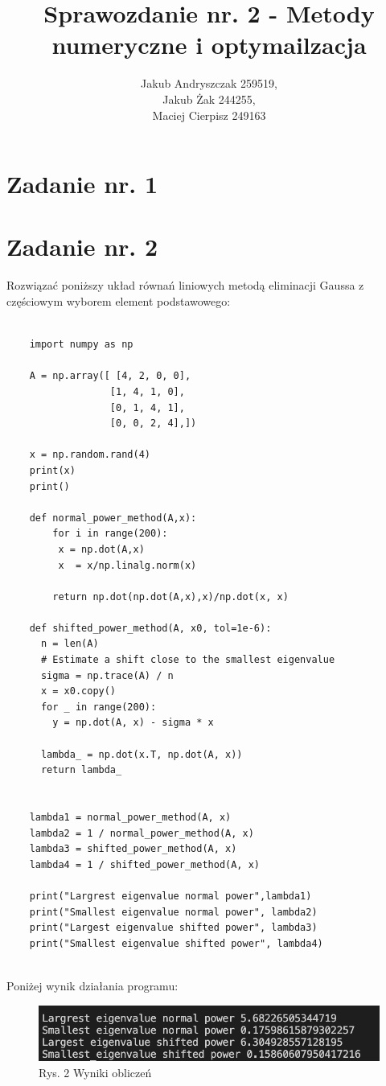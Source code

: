 \documentclass{article}
\begin{document}
\title{Sprawozdanie nr. 2 - Metody numeryczne i optymailzacja}
\author{Jakub Andryszczak 259519,\\ Jakub Żak 244255,\\ Maciej Cierpisz 249163}
\date{}
\maketitle

\newpage
\tableofcontents

\newpage
\section{Zadanie nr. 1}

\section{Zadanie nr. 2}

Rozwiązać poniższy układ równań liniowych metodą eliminacji Gaussa z częściowym
wyborem element podstawowego:

\begin{lstlisting}

    import numpy as np

    A = np.array([ [4, 2, 0, 0],
                  [1, 4, 1, 0],
                  [0, 1, 4, 1],
                  [0, 0, 2, 4],])
    
    x = np.random.rand(4)
    print(x)
    print()
    
    def normal_power_method(A,x):
        for i in range(200):
         x = np.dot(A,x)
         x  = x/np.linalg.norm(x)
        
        return np.dot(np.dot(A,x),x)/np.dot(x, x)
    
    def shifted_power_method(A, x0, tol=1e-6):
      n = len(A)
      # Estimate a shift close to the smallest eigenvalue
      sigma = np.trace(A) / n
      x = x0.copy()
      for _ in range(200):
        y = np.dot(A, x) - sigma * x
    
      lambda_ = np.dot(x.T, np.dot(A, x))
      return lambda_
       
    
    lambda1 = normal_power_method(A, x) 
    lambda2 = 1 / normal_power_method(A, x)
    lambda3 = shifted_power_method(A, x)
    lambda4 = 1 / shifted_power_method(A, x)
    
    print("Largrest eigenvalue normal power",lambda1)
    print("Smallest eigenvalue normal power", lambda2)
    print("Largest eigenvalue shifted power", lambda3)
    print("Smallest eigenvalue shifted power", lambda4)
  
  \end{lstlisting}
  \newpage
  Poniżej wynik działania programu:
  \begin{figure}[h]
    \includegraphics[scale=0.7]{image.png}
    \centering
    \caption*{Rys. 2 Wyniki obliczeń}
    \end{figure}
\end{document}
